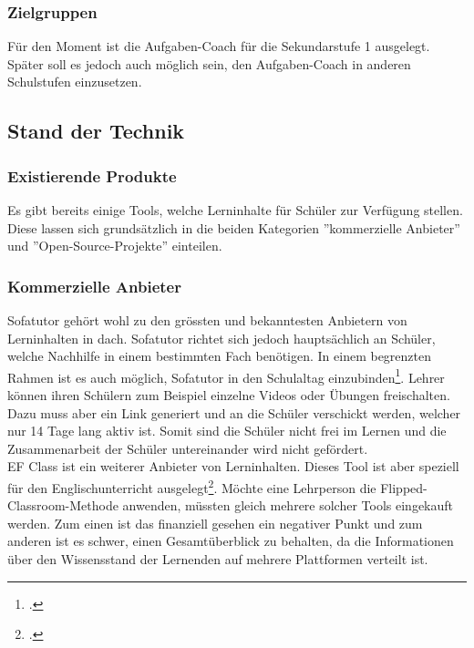 \subsubsection{Zielgruppen}
Für den Moment ist die Aufgaben-Coach für die Sekundarstufe 1 ausgelegt. Später soll es jedoch auch möglich sein, den Aufgaben-Coach in anderen Schulstufen einzusetzen.

\newpage

\subsection{Stand der Technik}
\subsubsection{Existierende Produkte}
Es gibt bereits einige Tools, welche Lerninhalte für Schüler zur Verfügung stellen. Diese lassen sich grundsätzlich in die beiden Kategorien ''kommerzielle Anbieter'' und ''Open-Source-Projekte'' einteilen.


\subsubsection*{Kommerzielle Anbieter}
Sofatutor gehört wohl zu den grössten und bekanntesten Anbietern von Lerninhalten in \gls{dach}. Sofatutor richtet sich jedoch hauptsächlich an Schüler, welche Nachhilfe in einem bestimmten Fach benötigen. In einem begrenzten Rahmen ist es auch möglich, Sofatutor in den Schulaltag einzubinden\footcite{sofatutor_fuer_lehrer}. Lehrer können ihren Schülern zum Beispiel einzelne Videos oder Übungen freischalten. Dazu muss aber ein Link generiert und an die Schüler verschickt werden, welcher nur 14 Tage lang aktiv ist. Somit sind die Schüler nicht frei im Lernen und die Zusammenarbeit der Schüler untereinander wird nicht gefördert.\\

EF Class ist ein weiterer Anbieter von Lerninhalten. Dieses Tool ist aber speziell für den Englischunterricht ausgelegt\footcite{ef_class_homepage}. Möchte eine Lehrperson die Flipped-Classroom-Methode anwenden, müssten gleich mehrere solcher Tools eingekauft werden. Zum einen ist das finanziell gesehen ein negativer Punkt und zum anderen ist es schwer, einen Gesamtüberblick zu behalten, da die Informationen über den Wissensstand der Lernenden auf mehrere Plattformen verteilt ist.


